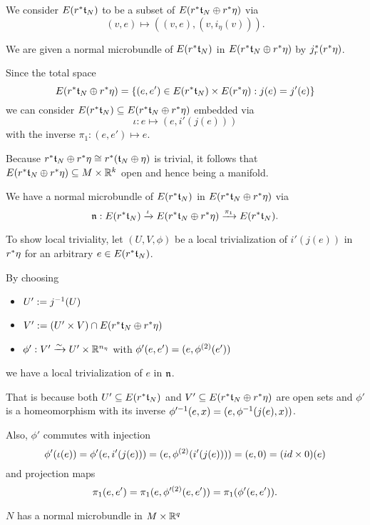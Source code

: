 \begin{scope}
\begin{myproof}
\begin{steps}
            We consider $E(r^*\mathfrak{t}_N)$ to be a subset of $E(r^*\mathfrak{t}_N \oplus{} r^*\eta)$ via
            \[ (v, e) \mapsto ((v, e), (v, i_{\eta}(v))). \]

            We are given a normal microbundle of $E(r^*\mathfrak{t}_N)$ in $E(r^*\mathfrak{t}_N \oplus{} r^*\eta)$ by $j_r^*(r^*\eta)$.

            Since the total space
            \[ E(r^*\mathfrak{t}_N \oplus{} r^*\eta) = \{(e, e') \in E(r^*\mathfrak{t}_N) \times E(r^*\eta):j(e) = j'(e)\} \]
            we can consider $E(r^*\mathfrak{t}_N) \subseteq{} E(r^*\mathfrak{t}_N \oplus{} r^*\eta)$ embedded via
            \[ \iota: e \mapsto (e, i'(j(e))) \]
            with the inverse $\pi_1: (e, e') \mapsto e$.

            Because $r^*\mathfrak{t}_N \oplus{} r^*\eta \cong r^*(\mathfrak{t}_N \oplus{} \eta)$ is trivial,
            it follows that $E(r^*\mathfrak{t}_N \oplus{} r^*\eta) \subseteq{} M \times \mathbb{R}^k$ open and hence being a manifold.

            We have a normal microbundle of $E(r^*\mathfrak{t}_N)$ in $E(r^*\mathfrak{t}_N \oplus{} r^*\eta)$ via
            \[ \mathfrak{n}: E(r^*\mathfrak{t}_N) \xrightarrow{\iota} E(r^*\mathfrak{t}_N \oplus{} r^*\eta) \xrightarrow{\pi_1} E(r^*\mathfrak{t}_N){}. \]

            To show local triviality,
            let $(U, V, \phi)$ be a local trivialization of $i'(j(e))$ in $r^*\eta$
            for an arbitrary $e \in E(r^*\mathfrak{t}_N)$.

            By choosing
            \begin{itemize}
                \item $U' := j^{-1}(U)$
                \item $V' := (U' \times V) \cap E(r^*\mathfrak{t}_N \oplus{} r^*\eta)$
                \item $\phi': V' \xrightarrow{\sim} U' \times \mathbb{R}^{n_\eta}$ with $\phi'(e, e') = (e, \phi^{(2)}(e'))$
            \end{itemize}
            we have a local trivialization of $e$ in $\mathfrak{n}$.

            That is because both $U' \subseteq{} E(r^*\mathfrak{t}_N)$ and $V' \subseteq{} E(r^*\mathfrak{t}_N \oplus{} r^*\eta)$ are open sets
            and $\phi'$ is a homeomorphism with its inverse
            $\phi'^{-1}(e, x) = (e, \phi^{-1}(j(e), x))$.
            
            Also, $\phi'$ commutes with injection
            \[ \phi'(\iota(e)) = \phi'(e, i'(j(e))) = (e, \phi^{(2)}(i'(j(e)))) = (e, 0) = (id \times 0)(e) \]
            and projection maps
            \[ \pi_1(e, e') = \pi_1(e, \phi'^{(2)}(e, e')) = \pi_1(\phi'(e, e')). \]
            
            \item $N$ has a normal microbundle in $M \times \mathbb{R}^q$
            

\end{steps}
\end{myproof}
\end{scope}
